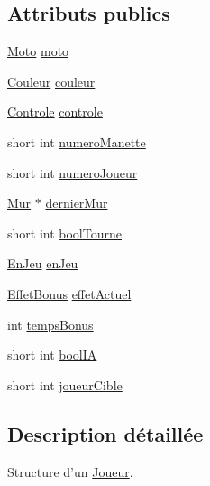 \subsection*{Attributs publics}
\begin{DoxyCompactItemize}
\item 
\hyperlink{structMoto}{Moto} \hyperlink{structJoueur_ac2768294956259e01d0744d6db789fe2}{moto}
\item 
\hyperlink{Couleur_8h_aa304d0ca681f782b1d7735da33037dd7}{Couleur} \hyperlink{structJoueur_a966bbda4413e0b0d7aaf109660926639}{couleur}
\item 
\hyperlink{structControle}{Controle} \hyperlink{structJoueur_a9e673b161d97d9530f7ff108d5ea8b52}{controle}
\item 
short int \hyperlink{structJoueur_aab4fb5652b29a6bdfc5dff4ed4dbe8da}{numero\-Manette}
\item 
short int \hyperlink{structJoueur_a16d5323b40b813198386623075de9fa1}{numero\-Joueur}
\item 
\hyperlink{structMur}{Mur} $\ast$ \hyperlink{structJoueur_a0af7df8d2ab1d60cad2cc220459d7aa3}{dernier\-Mur}
\item 
short int \hyperlink{structJoueur_a439aff6381e9272c2fbb737dfa2362bc}{bool\-Tourne}
\item 
\hyperlink{Joueur_8h_a43a9f41708ce5d7ddf49e05d61f48c3b}{En\-Jeu} \hyperlink{structJoueur_a83e062c54d98b446e0bb30a93d23f2fd}{en\-Jeu}
\item 
\hyperlink{EffetBonus_8h_a5c3ffd6a343fb8d5f63c87ee1a37a7fe}{Effet\-Bonus} \hyperlink{structJoueur_aba2ad8c2cbba6a62b7f30c76373f8b4e}{effet\-Actuel}
\item 
int \hyperlink{structJoueur_a924a294aef342302f978bc900cfdb98a}{temps\-Bonus}
\item 
short int \hyperlink{structJoueur_a2294a826a87221de10ee4aa493598493}{bool\-I\-A}
\item 
short int \hyperlink{structJoueur_a7672ceecb63c257cf2d9a659662620fc}{joueur\-Cible}
\end{DoxyCompactItemize}


\subsection{Description détaillée}
Structure d'un \hyperlink{structJoueur}{Joueur}. 

